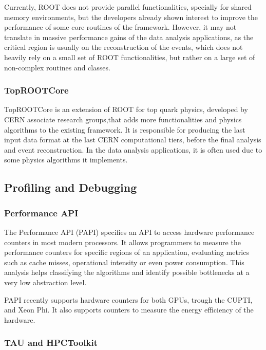 Currently, ROOT does not provide parallel functionalities, specially for shared memory environments, but the developers already shown interest to improve the performance of some core routines of the framework. However, it may not translate in massive performance gains of the data analysis applications, as the critical region is usually on the reconstruction of the events, which does not heavily rely on a small set of ROOT functionalities, but rather on a large set of non-complex routines and classes.

\subsubsection*{TopROOTCore}

TopROOTCore is an extension of ROOT for top quark physics, developed by CERN associate research groups,that adds more functionalities and physics algorithms to the existing framework. It is responsible for producing the last input data format at the last CERN computational tiers, before the final analysis and event reconstruction. In the data analysis applications, it is often used due to some physics algorithms it implements.

\subsection{Profiling and Debugging}
\label{tools}

\subsubsection*{Performance API}

The Performance API (PAPI) \cite{PAPI} specifies an API to access hardware performance counters in most modern processors. It allows programmers to measure the performance counters for specific regions of an application, evaluating metrics such as cache misses, operational intensity or even power consumption. This analysis helps classifying the algorithms and identify possible bottlenecks at a very low abstraction level.

PAPI recently supports hardware counters for both \nvidia GPUs, trough the \nvidia CUPTI, and \intel Xeon Phi. It also supports counters to measure the energy efficiency of the hardware. 

\subsubsection*{TAU and HPCToolkit}

